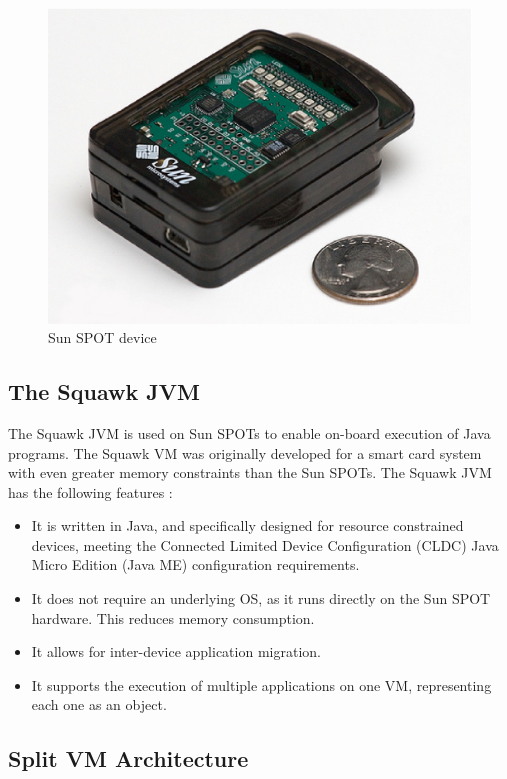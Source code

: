 \begin{figure} 
\centering
\includegraphics[scale=0.50]{img/sunspot1.eps} 
\caption[Sun SPOT device]{Sun SPOT device}
\label{Fig:SunSpot}
\end{figure} 


\subsection{The Squawk JVM}

The Squawk JVM is used on Sun SPOTs to enable on-board execution of Java
programs. The Squawk VM was originally developed for a smart card system with
even greater memory constraints than the Sun SPOTs. The Squawk JVM has the
following features \cite{simon_squawk:2006}:

\begin{itemize}
  \item It is written in Java, and specifically designed for resource
  constrained devices, meeting the Connected Limited Device Configuration
  (CLDC) Java Micro Edition (Java ME) configuration requirements.
  \item It does not require an underlying OS, as it runs directly on the Sun
  SPOT hardware. This reduces memory consumption.
  \item It allows for inter-device application migration.
  \item It supports the execution of multiple applications on one VM,
  representing each one as an object.
\end{itemize}

\subsection{Split VM Architecture}

